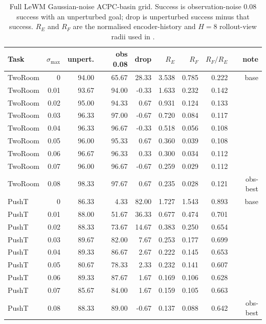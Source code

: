 \documentclass[10pt]{article}
\begin{document}
\begin{landscape}
\begin{table}[p]
\centering
\caption{Full LeWM Gaussian-noise ACPC-basin grid. Success is observation-noise 0.08 success with an unperturbed goal; drop is unperturbed success minus that success. $R_E$ and $R_F$ are the normalised encoder-history and $H=8$ rollout-view radii used in .}
\label{tab:acpc-basin-full-grid}
\scriptsize
\setlength{\tabcolsep}{4pt}
\renewcommand{\arraystretch}{0.96}
\begin{tabular}{lrrrrrrrr}
\toprule
Task & $\sigma_{\max}$ & unpert. & obs 0.08 & drop & $R_E$ & $R_F$ & $R_F/R_E$ & note \\
\midrule
TwoRoom & 0 & 94.00 & 65.67 & 28.33 & 3.538 & 0.785 & 0.222 & base \\
TwoRoom & 0.01 & 93.67 & 94.00 & -0.33 & 1.633 & 0.232 & 0.142 &  \\
TwoRoom & 0.02 & 95.00 & 94.33 & 0.67 & 0.931 & 0.124 & 0.133 &  \\
TwoRoom & 0.03 & 96.33 & 97.00 & -0.67 & 0.720 & 0.084 & 0.117 &  \\
TwoRoom & 0.04 & 96.33 & 96.67 & -0.33 & 0.518 & 0.056 & 0.108 &  \\
TwoRoom & 0.05 & 96.00 & 95.33 & 0.67 & 0.360 & 0.039 & 0.108 &  \\
TwoRoom & 0.06 & 96.67 & 96.33 & 0.33 & 0.300 & 0.034 & 0.112 &  \\
TwoRoom & 0.07 & 96.00 & 96.67 & -0.67 & 0.259 & 0.029 & 0.112 &  \\
TwoRoom & 0.08 & 98.33 & 97.67 & 0.67 & 0.235 & 0.028 & 0.121 & obs-best \\
\midrule
PushT & 0 & 86.33 & 4.33 & 82.00 & 1.727 & 1.543 & 0.893 & base \\
PushT & 0.01 & 88.00 & 51.67 & 36.33 & 0.677 & 0.474 & 0.701 &  \\
PushT & 0.02 & 88.33 & 73.67 & 14.67 & 0.383 & 0.250 & 0.654 &  \\
PushT & 0.03 & 89.67 & 82.00 & 7.67 & 0.253 & 0.177 & 0.699 &  \\
PushT & 0.04 & 89.33 & 86.67 & 2.67 & 0.222 & 0.145 & 0.653 &  \\
PushT & 0.05 & 80.67 & 78.33 & 2.33 & 0.232 & 0.141 & 0.607 &  \\
PushT & 0.06 & 89.33 & 87.67 & 1.67 & 0.169 & 0.106 & 0.628 &  \\
PushT & 0.07 & 85.67 & 84.00 & 1.67 & 0.159 & 0.105 & 0.663 &  \\
PushT & 0.08 & 88.33 & 89.00 & -0.67 & 0.137 & 0.088 & 0.642 & obs-best \\

\end{tabular}
\end{table}
\end{landscape}
\end{document}
